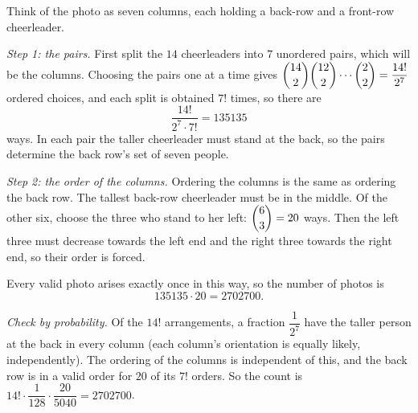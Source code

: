 Think of the photo as seven columns, each holding a back-row and a front-row cheerleader.

\emph{Step 1: the pairs.} First split the $14$ cheerleaders into $7$ unordered pairs, which will be the columns. Choosing the pairs one at a time gives $\dbinom{14}{2}\dbinom{12}{2}\cdots\dbinom{2}{2}=\dfrac{14!}{2^7}$ ordered choices, and each split is obtained $7!$ times, so there are
\[\dfrac{14!}{2^7\cdot7!}=135135\]
ways. In each pair the taller cheerleader must stand at the back, so the pairs determine the back row's set of seven people.

\emph{Step 2: the order of the columns.} Ordering the columns is the same as ordering the back row. The tallest back-row cheerleader must be in the middle. Of the other six, choose the three who stand to her left: $\dbinom63=20$ ways. Then the left three must decrease towards the left end and the right three towards the right end, so their order is forced.

Every valid photo arises exactly once in this way, so the number of photos is
\[135135\cdot20=\boxed{2702700}.\]

\emph{Check by probability.} Of the $14!$ arrangements, a fraction $\dfrac{1}{2^7}$ have the taller person at the back in every column (each column's orientation is equally likely, independently). The ordering of the columns is independent of this, and the back row is in a valid order for $20$ of its $7!$ orders. So the count is $14!\cdot\dfrac{1}{128}\cdot\dfrac{20}{5040}=2702700$.
